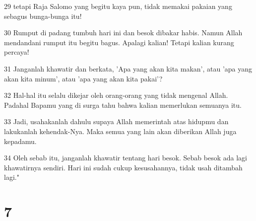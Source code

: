 \par 29 tetapi Raja Salomo yang begitu kaya pun, tidak memakai pakaian yang sebagus bunga-bunga itu!
\par 30 Rumput di padang tumbuh hari ini dan besok dibakar habis. Namun Allah mendandani rumput itu begitu bagus. Apalagi kalian! Tetapi kalian kurang percaya!
\par 31 Janganlah khawatir dan berkata, 'Apa yang akan kita makan', atau 'apa yang akan kita minum', atau 'apa yang akan kita pakai'?
\par 32 Hal-hal itu selalu dikejar oleh orang-orang yang tidak mengenal Allah. Padahal Bapamu yang di surga tahu bahwa kalian memerlukan semuanya itu.
\par 33 Jadi, usahakanlah dahulu supaya Allah memerintah atas hidupmu dan lakukanlah kehendak-Nya. Maka semua yang lain akan diberikan Allah juga kepadamu.
\par 34 Oleh sebab itu, janganlah khawatir tentang hari besok. Sebab besok ada lagi khawatirnya sendiri. Hari ini sudah cukup kesusahannya, tidak usah ditambah lagi."

\chapter{7}

